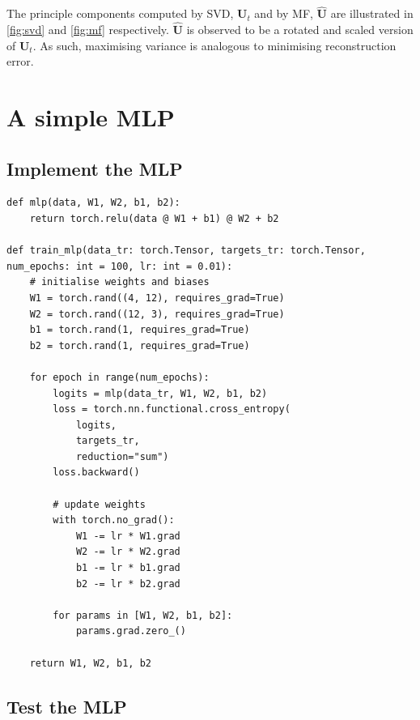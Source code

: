 \documentclass[10pt, twocolumn]{article}
\begin{document}
The principle components computed by SVD, $\pmb{U}_t$ and by MF, $\hat{\pmb{U}}$ are illustrated in \cref{fig:svd} and \cref{fig:mf} respectively. $\hat{\pmb{U}}$ is observed to be a rotated and scaled version of $\pmb{U}_t$. As such, maximising variance is analogous to minimising reconstruction error.

\section{A simple MLP}

\subsection{Implement the MLP}

\begin{lstlisting}
def mlp(data, W1, W2, b1, b2):
    return torch.relu(data @ W1 + b1) @ W2 + b2

def train_mlp(data_tr: torch.Tensor, targets_tr: torch.Tensor, num_epochs: int = 100, lr: int = 0.01):
    # initialise weights and biases
    W1 = torch.rand((4, 12), requires_grad=True)
    W2 = torch.rand((12, 3), requires_grad=True)
    b1 = torch.rand(1, requires_grad=True)
    b2 = torch.rand(1, requires_grad=True)

    for epoch in range(num_epochs):
        logits = mlp(data_tr, W1, W2, b1, b2)
        loss = torch.nn.functional.cross_entropy(
            logits, 
            targets_tr, 
            reduction="sum")
        loss.backward()

        # update weights
        with torch.no_grad():
            W1 -= lr * W1.grad
            W2 -= lr * W2.grad
            b1 -= lr * b1.grad
            b2 -= lr * b2.grad

        for params in [W1, W2, b1, b2]:
            params.grad.zero_()

    return W1, W2, b1, b2
\end{lstlisting}

\subsection{Test the MLP}

\end{document}
